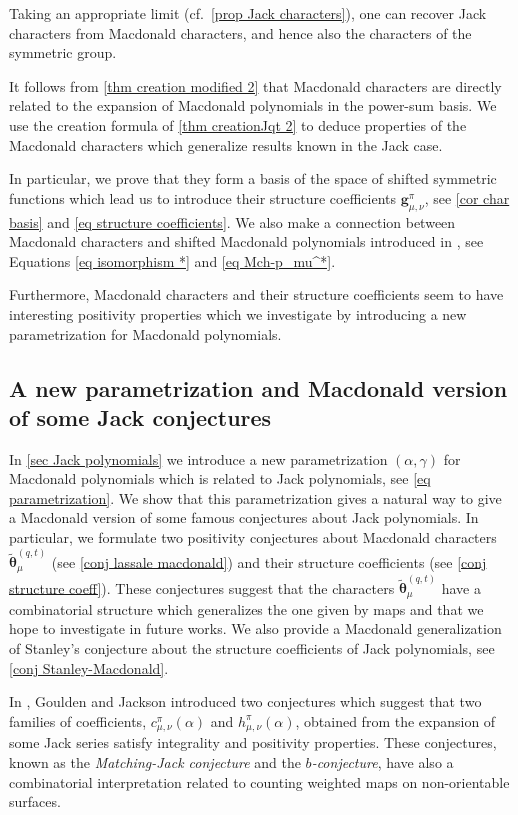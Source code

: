 \documentclass[12pt]{amsart}
\theoremstyle{remark}
\newcommand{\bfg}{\boldsymbol{g}}
\newcommand{\Mch}{\boldsymbol{\widetilde\theta}^{(q,t)}}
\begin{document}
Taking an appropriate limit (cf.\ \cref{prop Jack characters}), one can recover Jack characters from Macdonald characters, and hence also the characters of the symmetric group.

It follows from \cref{thm creation modified 2} that Macdonald characters are directly related to the expansion of Macdonald polynomials in the power-sum basis. We use the creation formula of \cref{thm creationJqt 2} to deduce properties of the Macdonald characters which generalize results known in the Jack case. 

In particular, we prove that they form a basis of the space of shifted symmetric functions which lead us to introduce their structure coefficients $\bfg^\pi_{\mu,\nu}$, see \cref{cor char basis} and \cref{eq structure coefficients}.
We also make a connection between Macdonald characters and shifted Macdonald polynomials introduced in \cite{Lassalle1998,Okounkov1998}, see Equations \eqref{eq isomorphism *} and \eqref{eq Mch-p_mu^*}. 

Furthermore, Macdonald characters and their structure coefficients seem to have interesting positivity properties which we investigate by introducing a new parametrization for Macdonald polynomials.

\subsection{A new parametrization and Macdonald version of some Jack conjectures}
In \cref{sec Jack polynomials} we introduce a new parametrization $(\alpha,\gamma)$ for Macdonald polynomials which is related to Jack polynomials, see \cref{eq parametrization}. We show that this parametrization gives a natural way to give a Macdonald version of some famous conjectures about Jack polynomials.  In particular, we formulate two positivity conjectures about Macdonald characters $\Mch_\mu$ (see \cref{conj lassale macdonald}) and their structure coefficients (see \cref{conj structure coeff}). These conjectures suggest that the characters $\Mch_\mu$ have a combinatorial structure  which generalizes the one given by maps and that we hope to investigate in future works. 
We also provide a Macdonald generalization of Stanley's conjecture about the structure coefficients of Jack polynomials, see \cref{conj Stanley-Macdonald}.

In \cite{GouldenJackson1996}, Goulden and Jackson introduced two conjectures which suggest that two  families of coefficients, $c^\pi_{\mu,\nu}(\alpha)$ and $h^\pi_{\mu,\nu}(\alpha)$, obtained from the expansion of some Jack series satisfy integrality and positivity properties. These conjectures,  known as the \textit{Matching-Jack conjecture} and the \textit{$b$-conjecture}, have also a combinatorial interpretation related to counting weighted maps on non-orientable surfaces.
\end{document}
